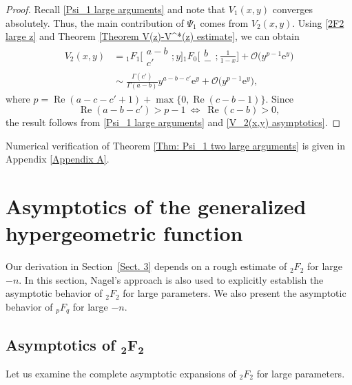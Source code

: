 \documentclass[10pt,a4paper]{amsart}
\numberwithin{equation}{section}
\newcommand{\me}{\mathrm{e}}
\newcommand{\mo}{\mathcal{O}}
\begin{document}
\begin{proof}
	Recall \eqref{Psi_1 large arguments} and note that $V_1(x,y)$ converges absolutely. Thus, the main contribution of $\Psi_1$ comes from $V_2(x,y)$. Using \eqref{2F2 large z} and Theorem \ref{Theorem V(z)-V^*(z) estimate}, we can obtain
	\begin{align}
		V_2(x,y)&{} ={}_1F_1\biggl[\begin{matrix}
			a-b\\
			c'
		\end{matrix};y\biggr]{}_1F_0\biggl[\begin{matrix}
			b\\
			-
		\end{matrix};\frac{1}{1-x}\biggr]+\mo\bigl(y^{p-1}\me^y\bigr)\nonumber\\
		&{} \sim \frac{\Gamma(c')}{\Gamma(a-b)}y^{a-b-c'}\me^y+\mo\bigl(y^{p-1}\me^y\bigr), \label{V_2(x,y) asymptotics}
	\end{align}
	where $p=\operatorname{Re}(a-c-c'+1)+\max\{0,\operatorname{Re}(c-b-1)\}$. Since
	\[\operatorname{Re}(a-b-c')>p-1 \ \Leftrightarrow \ \operatorname{Re}(c-b)>0,\]
	the result follows from \eqref{Psi_1 large arguments} and \eqref{V_2(x,y) asymptotics}.
\end{proof}

Numerical verification of Theorem \ref{Thm: Psi_1 two large arguments} is given in Appendix \ref{Appendix A}.



\section{Asymptotics of the generalized hypergeometric function}\label{Sect. 4}
Our derivation in Section~\ref{Sect. 3} depends on a rough estimate of $_2F_2$ for large $-n$. In this section, Nagel's approach is also used to explicitly establish the asymptotic behavior of $_2F_2$ for large parameters. We also present the asymptotic behavior of $_pF_q$ for large $-n$.

\subsection[Asymptotics of \_2F\_2]{Asymptotics of $\boldsymbol{_2F_2}$}
Let us examine the complete asymptotic expansions of $_2F_2$ for large parameters.
\end{document}
